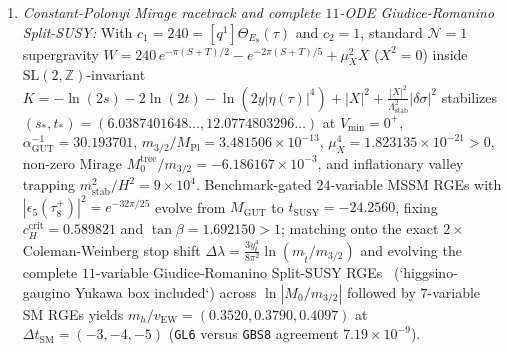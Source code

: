 \documentclass[aps,prd,twocolumn,nofootinbib,floatfix]{revtex4-2}
\begin{document}
\begin{enumerate}
    \item \emph{Constant-Polonyi Mirage racetrack and complete $11$-ODE Giudice-Romanino Split-SUSY:} With $c_1 = 240 = [q^1]\Theta_{E_8}(\tau)$ and $c_2 = 1$, standard $\mathcal{N}=1$ supergravity $W = 240\,e^{-\pi(S+T)/2} - e^{-2\pi(S+T)/5} + \mu_X^2 X$ ($X^2 = 0$) inside $\mathrm{SL}(2,\mathbb{Z})$-invariant $K = -\ln(2s) - 2\ln(2t) - \ln(2y|\eta(\tau)|^4) + |X|^2 + \frac{|X|^2}{\Lambda_{\mathrm{stab}}^2}|\delta\sigma|^2$ stabilizes $(s_*, t_*) = (6.0387401648\dots, 12.0774803296\dots)$ at $V_{\min} = 0^+$, $\alpha_{\mathrm{GUT}}^{-1} = 30.193701$, $m_{3/2}/M_{\mathrm{Pl}} = 3.481506\times 10^{-13}$, $\mu_X^4 = 1.823135\times 10^{-21} > 0$, non-zero Mirage $M_0^{\mathrm{tree}}/m_{3/2} = -6.186167\times 10^{-3}$, and inflationary valley trapping $m_{\mathrm{stab}}^2/H^2 = 9\times 10^4$. Benchmark-gated $24$-variable MSSM RGEs with $|\epsilon_5(\tau_8^+)|^2 = e^{-32\pi/25}$ evolve from $M_{\mathrm{GUT}}$ to $t_{\mathrm{SUSY}} = -24.2560$, fixing $c_H^{\mathrm{crit}} = 0.589821$ and $\tan\beta = 1.692150 > 1$; matching onto the exact $2\times$ Coleman-Weinberg stop shift $\Delta\lambda = \frac{3 y_t^4}{8\pi^2}\ln(m_{\tilde{t}}/m_{3/2})$ and evolving the complete $11$-variable Giudice-Romanino Split-SUSY RGEs~\cite{GiudiceRomanino2004} (`higgsino-gaugino Yukawa box included`) across $\ln|M_0/m_{3/2}|$ followed by $7$-variable SM RGEs yields $m_h/v_{\mathrm{EW}} = (0.3520, 0.3790, 0.4097)$ at $\Delta t_{\mathrm{SM}} = (-3, -4, -5)$ (\texttt{GL6} versus \texttt{GBS8} agreement $7.19\times 10^{-9}$).
\end{enumerate}
\end{document}
